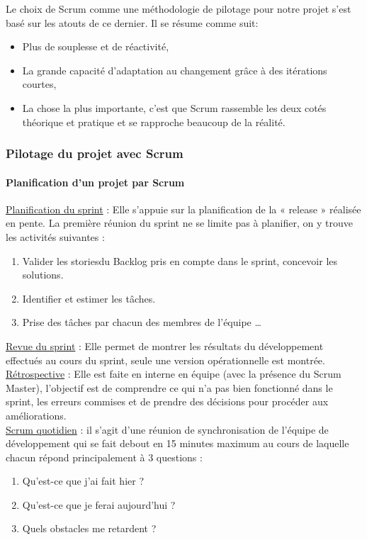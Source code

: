 \documentclass{article}
\begin{document}
Le choix de Scrum comme une méthodologie de pilotage pour notre projet s’est basé sur les atouts de ce dernier. Il se résume comme suit:
\begin{itemize}
\item Plus de souplesse et de réactivité,
\item La grande capacité d’adaptation au changement grâce à des itérations courtes,
\item La chose la plus importante, c’est que Scrum rassemble les deux cotés théorique et pratique et se rapproche beaucoup de la réalité.

\end{itemize}
\cleardoublepage
\subsubsection{Pilotage du projet avec Scrum}
\paragraph{Planification d’un projet par Scrum}
\uline{Planification du sprint} : Elle s’appuie sur la planification de la « release » réalisée en pente. La première réunion du sprint ne se limite pas à planifier, on y trouve les activités suivantes :
\begin{enumerate}
\item Valider les \guillemotleft stories\guillemotright du Backlog pris en compte dans le sprint, concevoir les solutions.
\item Identifier et estimer les tâches.
\item Prise des tâches par chacun des membres de l’équipe …
\end{enumerate}
\uline{Revue du sprint} : Elle permet de montrer les résultats du développement effectués au cours du sprint, seule une version opérationnelle est montrée.\\
\uline{Rétrospective} : Elle est faite en interne en équipe (avec la présence du Scrum Master), l’objectif est de comprendre ce qui n’a pas bien fonctionné dans le sprint, les erreurs commises et de prendre des décisions pour procéder aux améliorations.\\
\uline{Scrum quotidien} : il s’agit d’une réunion de synchronisation de l’équipe de développement qui se fait debout en 15 minutes maximum au cours de laquelle chacun répond principalement à 3 questions :
\begin{enumerate}
\item Qu’est-ce que j’ai fait hier ?
\item Qu’est-ce que je ferai aujourd’hui ?
\item Quels obstacles me retardent ?
\end{enumerate}
\end{document}
